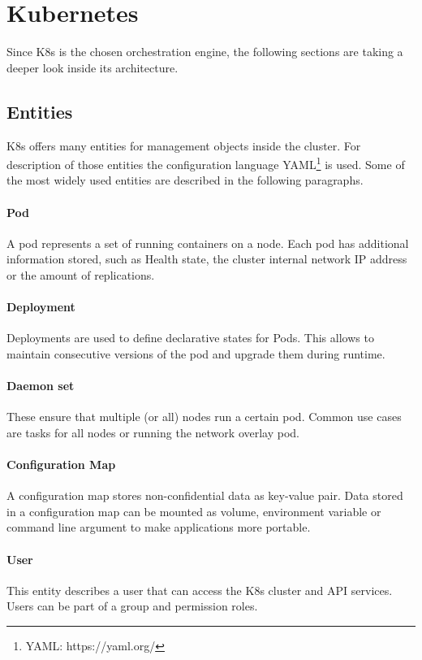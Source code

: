 \section{Kubernetes}
Since \ac{K8s} is the chosen orchestration engine, the following sections are taking a deeper look inside its architecture.

\subsection{Entities}
\ac{K8s} offers many entities for management objects inside the cluster. For description of those entities the configuration language YAML\footnote{YAML: https://yaml.org/} is used. Some of the most widely used entities are described in the following paragraphs.

\paragraph*{Pod} A pod represents a set of running containers on a node. Each pod has additional information stored, such as Health state, the cluster internal network \ac{IP} address or the amount of replications.
\paragraph*{Deployment}
Deployments are used to define declarative states for Pods. This allows to maintain consecutive versions of the pod and upgrade them during runtime.
\paragraph*{Daemon set} These ensure that multiple (or all) nodes run a certain pod\cite{Kubernetes.20220831}. Common use cases are tasks for all nodes or running the network overlay pod.
\paragraph*{Configuration Map} A configuration map stores non-confidential data as key-value pair\cite{Kubernetes.20221024b}. Data stored in a configuration map can be mounted as volume, environment variable or command line argument to make applications more portable\cite{Kubernetes.20221024b}.
\paragraph*{User} This entity describes a user that  can access the \ac{K8s} cluster and \ac{API} services. Users can be part of a group and permission roles.
